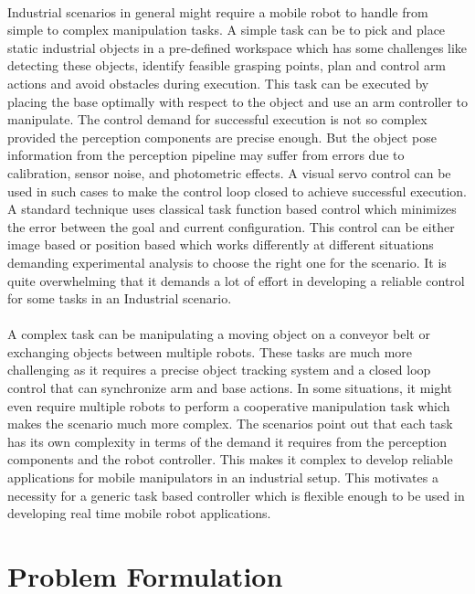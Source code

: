  \paragraph{}
 Industrial scenarios in general might require a mobile robot to handle from simple to complex manipulation tasks. A simple task can be to pick and place static industrial objects in a pre-defined workspace which has some challenges like detecting these objects, identify feasible grasping points, plan and control arm actions and avoid obstacles during execution. This task can be executed by placing the base optimally with respect to the object and use an arm controller to manipulate. The control demand for successful execution is not so complex provided the perception components are precise enough. But the object pose information from the perception pipeline may suffer from errors due to calibration, sensor noise, and photometric effects. A visual servo control can be used in such cases to make the control loop closed to achieve successful execution. A standard technique uses classical task function based control which minimizes the error between the goal and current configuration. This control can be either image based or position based which works differently at different situations demanding experimental analysis to choose the right one for the scenario. It is quite overwhelming that it demands a lot of effort in developing a reliable control for some tasks in an Industrial scenario. 
 
  \paragraph{}
  A complex task can be manipulating a moving object on a conveyor belt or exchanging objects between multiple robots. These tasks are much more challenging as it requires a precise object tracking system and a closed loop control that can synchronize arm and base actions. In some situations, it might even require multiple robots to perform a cooperative manipulation task which makes the scenario much more complex. The scenarios point out that each task has its own complexity in terms of the demand it requires from the perception components and the robot controller. This makes it complex to develop reliable applications for mobile manipulators in an industrial setup. This motivates a necessity for a generic task based controller which is flexible enough to be used in developing real time mobile robot applications. 

 \section{Problem Formulation}
